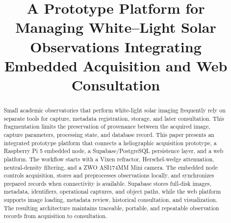 \documentclass[conference,a4paper]{IEEEtran}
\makeatletter
\newcommand{\linebreakand}{%
  \end{@IEEEauthorhalign}
  \hfill\mbox{}\par
  \mbox{}\hfill\begin{@IEEEauthorhalign}
}
\makeatother
\begin{document}
\title{A Prototype Platform for Managing White--Light Solar Observations Integrating Embedded Acquisition and Web Consultation}

\author{
}

\maketitle

\begin{abstract}
Small academic observatories that perform white-light solar imaging frequently rely on separate tools for capture, metadata registration, storage, and later consultation. This fragmentation limits the preservation of provenance between the acquired image, capture parameters, processing state, and database record. This paper presents an integrated prototype platform that connects a heliographic acquisition prototype, a Raspberry Pi 5 embedded node, a Supabase/PostgreSQL persistence layer, and a web platform. The workflow starts with a Vixen refractor, Herschel-wedge attenuation, neutral-density filtering, and a ZWO ASI174MM Mini camera. The embedded node controls acquisition, stores and preprocesses observations locally, and synchronizes prepared records when connectivity is available. Supabase stores full-disk images, metadata, identifiers, operational captures, and object paths, while the web platform supports image loading, metadata review, historical consultation, and visualization. The resulting architecture maintains traceable, portable, and repeatable observation records from acquisition to consultation.
\end{abstract}
\end{document}
